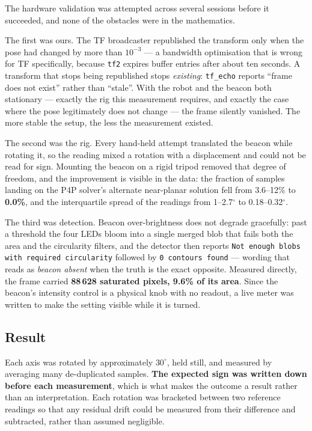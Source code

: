 \documentclass[11pt]{article}
\begin{document}
The hardware validation was attempted across several sessions before it
succeeded, and none of the obstacles were in the mathematics.

The first was ours. The TF broadcaster republished the transform only when
the pose had changed by more than $10^{-3}$ --- a bandwidth optimisation
that is wrong for TF specifically, because \texttt{tf2} expires buffer
entries after about ten seconds. A transform that stops being republished
stops \emph{existing}: \texttt{tf\_echo} reports ``frame does not exist''
rather than ``stale''. With the robot and the beacon both stationary ---
exactly the rig this measurement requires, and exactly the case where the
pose legitimately does not change --- the frame silently vanished. The more
stable the setup, the less the measurement existed.

The second was the rig. Every hand-held attempt translated the beacon while
rotating it, so the reading mixed a rotation with a displacement and could
not be read for sign. Mounting the beacon on a rigid tripod removed that
degree of freedom, and the improvement is visible in the data: the fraction
of samples landing on the P4P solver's alternate near-planar solution fell
from 3.6--12\% to \textbf{0.0\%}, and the interquartile spread of the
readings from 1--2.7$^\circ$ to 0.18--0.32$^\circ$.

The third was detection. Beacon over-brightness does not degrade gracefully:
past a threshold the four LEDs bloom into a single merged blob that fails
both the area and the circularity filters, and the detector then reports
\texttt{Not enough blobs with required circularity} followed by
\texttt{0 contours found} --- wording that reads as \emph{beacon absent}
when the truth is the exact opposite. Measured directly, the frame carried
\textbf{88\,628 saturated pixels, 9.6\% of its area}. Since the beacon's
intensity control is a physical knob with no readout, a live meter was
written to make the setting visible while it is turned.

\subsection{Result}

Each axis was rotated by approximately $30^\circ$, held still, and measured
by averaging many de-duplicated samples. \textbf{The expected sign was
written down before each measurement}, which is what makes the outcome a
result rather than an interpretation. Each rotation was bracketed between
two reference readings so that any residual drift could be measured from
their difference and subtracted, rather than assumed negligible.
\end{document}

